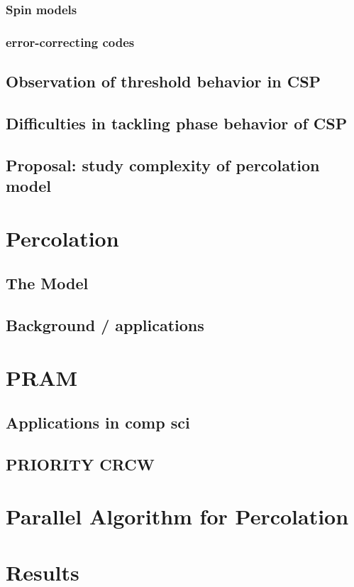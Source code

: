 \documentclass{umthesis}
\begin{document}
\subsubsection{Spin models}
\label{sec-4.1.5}
\subsubsection{error-correcting codes}
\label{sec-4.1.6}
\subsection{Observation of threshold behavior in CSP}
\label{sec-4.1.7}
\subsection{Difficulties in tackling phase behavior of CSP}
\label{sec-4.1.8}
\subsection{Proposal: study complexity of percolation model}
\label{sec-4.1.9}
\section{Percolation}
\label{sec-4.2}
\subsection{The Model}
\label{sec-4.2.1}
\subsection{Background / applications}
\label{sec-4.2.2}
\section{PRAM}
\label{sec-4.3}
\subsection{Applications in comp sci}
\label{sec-4.3.1}
\subsection{PRIORITY CRCW}
\label{sec-4.3.2}
\section{Parallel Algorithm for Percolation}
\label{sec-4.4}
\section{Results}
\label{sec-4.5}
\end{document}
